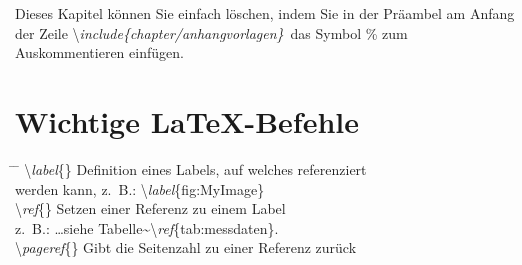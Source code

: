\setcounter{chapter}{5}
\setcounter{section}{0}
\setcounter{table}{0}
\setcounter{figure}{0}

Dieses Kapitel können Sie einfach löschen, indem Sie in der Präambel am Anfang der Zeile \glqq \textbackslash\textit{include\{chapter/anhang\lowrule vorlagen\}}\grqq~das Symbol \% zum Auskommentieren einfügen.

\section{Wichtige \LaTeX -Befehle}

\begin{tabbing}
\hspace*{0cm} \= \hspace{0.42\linewidth} \= \+\kill
\textbackslash \textit{label}\{\}	\> Definition eines Labels, auf welches referenziert \\ 
	\> werden kann, z.~B.: \textbackslash \textit{label}\{fig:MyImage\}\\ 
\textbackslash \textit{ref}\{\}	\> Setzen einer Referenz zu einem Label\\
\> z.~B.: \ldots siehe Tabelle\~{}\textbackslash \textit{ref}\{tab:messdaten\}.\\ 
\textbackslash \textit{pageref}\{\}	\> Gibt die Seitenzahl zu einer Referenz zurück\\


\end{tabbing}
